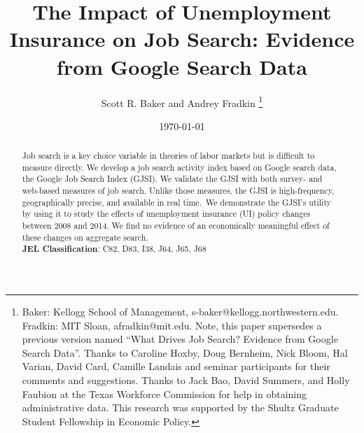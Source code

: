 \documentclass[12pt]{article}
\begin{document}
\title{\vspace{-25mm} The Impact of Unemployment Insurance on Job Search: Evidence from Google Search Data}

\begin{spacing}{2}

\author{Scott R. Baker and Andrey Fradkin
\thanks{%
Baker: Kellogg School of Management, s-baker@kellogg.northwestern.edu. Fradkin: MIT Sloan, afradkin@mit.edu. Note, this paper supersedes a previous version named ``What Drives Job Search? Evidence from Google Search Data''. Thanks to Caroline Hoxby, Doug Bernheim, Nick Bloom, Hal Varian, David Card, Camille Landais and seminar participants for their comments and suggestions. Thanks to Jack Bao, David Summers, and Holly Faubion at the Texas Workforce Commission for help in obtaining administrative data. This research was supported by the Shultz Graduate Student Fellowship in Economic Policy.}}

\date{\today}
\maketitle


\begin{abstract}
Job search is a key choice variable in theories of labor markets but is difficult to measure directly. We develop a job search activity index based on Google search data, the Google Job Search Index (GJSI). We validate the GJSI with both survey- and web-based measures of job search. Unlike those measures, the GJSI is high-frequency, geographically precise, and available in real time. We demonstrate the GJSI's utility by using it to study the effects of unemployment insurance (UI) policy changes between 2008 and 2014. We find no evidence of an economically meaningful effect of these changes on aggregate search. \\
\textbf{JEL Classification}: C82, D83, I38, J64, J65, J68
\end{abstract}

\clearpage




\end{spacing}
\end{document}
